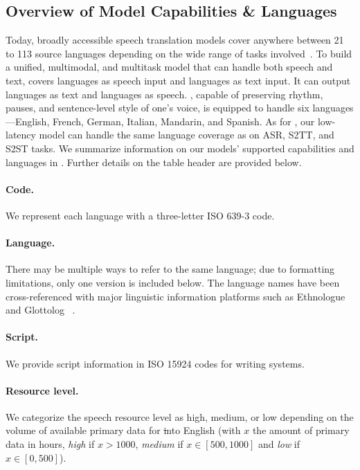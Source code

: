 \subsection{Overview of Model Capabilities \& Languages}
Today, broadly accessible speech translation models cover anywhere between 21 to 113 source languages depending on the wide range of tasks involved~\citep{google_usm,Rubenstein2023AudioPaLMAL}. 
To build a unified, multimodal, and multitask model that can handle both speech and text, 
\mfourttwo covers \nsslangs languages as speech input 
and \nasrlangs languages as text input.
It can output \nasrlangs languages as text 
and \nvocoderlangs languages as speech.
\seamlessexpressive, capable of preserving rhythm, pauses, and sentence-level style of one's voice, is equipped to handle six languages—English, French, German, Italian, Mandarin, and Spanish. 
As for \seamlessstreaming, our low-latency model can handle the same language coverage as \mfourttwo on ASR, S2TT, and S2ST tasks.
We summarize information on our models' supported capabilities and languages in . Further details on the table header are provided below.

\paragraph{Code.}
We represent each language with a three-letter ISO 639-3 code. 

\paragraph{Language.}
There may be multiple ways to refer to the same language; due to formatting limitations, only one version is included below. The language names have been cross-referenced with major linguistic information platforms such as Ethnologue~\citep{ethnologue2009} and Glottolog ~\citep{glottolog2022}.


\paragraph{Script.}
We provide script information in ISO 15924 codes for writing systems. 

\paragraph{Resource level.} We categorize the speech resource level as high, medium, or low depending on the volume of available primary data for \st into English (with $x$ the amount of primary data in hours, \textit{high} if $x>1000$, \textit{medium} if $x\in[500, 1000]$ and \textit{low} if $x\in[0, 500]$).

